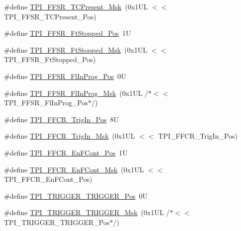 \begin{DoxyCompactItemize}
\item 
\#define \mbox{\hyperlink{group___c_m_s_i_s___t_p_i_ga0d6bfd263ff2fdec72d6ec9415fb1135}{T\+P\+I\+\_\+\+F\+F\+S\+R\+\_\+\+T\+C\+Present\+\_\+\+Msk}}~(0x1\+U\+L $<$$<$ T\+P\+I\+\_\+\+F\+F\+S\+R\+\_\+\+T\+C\+Present\+\_\+\+Pos)
\item 
\#define \mbox{\hyperlink{group___c_m_s_i_s___t_p_i_gaedf31fd453a878021b542b644e2869d2}{T\+P\+I\+\_\+\+F\+F\+S\+R\+\_\+\+Ft\+Stopped\+\_\+\+Pos}}~1U
\item 
\#define \mbox{\hyperlink{group___c_m_s_i_s___t_p_i_ga1ab6c3abe1cf6311ee07e7c479ce5f78}{T\+P\+I\+\_\+\+F\+F\+S\+R\+\_\+\+Ft\+Stopped\+\_\+\+Msk}}~(0x1\+U\+L $<$$<$ T\+P\+I\+\_\+\+F\+F\+S\+R\+\_\+\+Ft\+Stopped\+\_\+\+Pos)
\item 
\#define \mbox{\hyperlink{group___c_m_s_i_s___t_p_i_ga542ca74a081588273e6d5275ba5da6bf}{T\+P\+I\+\_\+\+F\+F\+S\+R\+\_\+\+Fl\+In\+Prog\+\_\+\+Pos}}~0U
\item 
\#define \mbox{\hyperlink{group___c_m_s_i_s___t_p_i_ga63dfb09259893958962914fc3a9e3824}{T\+P\+I\+\_\+\+F\+F\+S\+R\+\_\+\+Fl\+In\+Prog\+\_\+\+Msk}}~(0x1\+U\+L /$\ast$$<$$<$ T\+P\+I\+\_\+\+F\+F\+S\+R\+\_\+\+Fl\+In\+Prog\+\_\+\+Pos$\ast$/)
\item 
\#define \mbox{\hyperlink{group___c_m_s_i_s___t_p_i_gaa7ea11ba6ea75b541cd82e185c725b5b}{T\+P\+I\+\_\+\+F\+F\+C\+R\+\_\+\+Trig\+In\+\_\+\+Pos}}~8U
\item 
\#define \mbox{\hyperlink{group___c_m_s_i_s___t_p_i_ga360b413bc5da61f751546a7133c3e4dd}{T\+P\+I\+\_\+\+F\+F\+C\+R\+\_\+\+Trig\+In\+\_\+\+Msk}}~(0x1\+U\+L $<$$<$ T\+P\+I\+\_\+\+F\+F\+C\+R\+\_\+\+Trig\+In\+\_\+\+Pos)
\item 
\#define \mbox{\hyperlink{group___c_m_s_i_s___t_p_i_ga99e58a0960b275a773b245e2b69b9a64}{T\+P\+I\+\_\+\+F\+F\+C\+R\+\_\+\+En\+F\+Cont\+\_\+\+Pos}}~1U
\item 
\#define \mbox{\hyperlink{group___c_m_s_i_s___t_p_i_ga27d1ecf2e0ff496df03457a2a97cb2c9}{T\+P\+I\+\_\+\+F\+F\+C\+R\+\_\+\+En\+F\+Cont\+\_\+\+Msk}}~(0x1\+U\+L $<$$<$ T\+P\+I\+\_\+\+F\+F\+C\+R\+\_\+\+En\+F\+Cont\+\_\+\+Pos)
\item 
\#define \mbox{\hyperlink{group___c_m_s_i_s___t_p_i_ga5517fa2ced64efbbd413720329c50b99}{T\+P\+I\+\_\+\+T\+R\+I\+G\+G\+E\+R\+\_\+\+T\+R\+I\+G\+G\+E\+R\+\_\+\+Pos}}~0U
\item 
\#define \mbox{\hyperlink{group___c_m_s_i_s___t_p_i_ga814227af2b2665a0687bb49345e21110}{T\+P\+I\+\_\+\+T\+R\+I\+G\+G\+E\+R\+\_\+\+T\+R\+I\+G\+G\+E\+R\+\_\+\+Msk}}~(0x1\+U\+L /$\ast$$<$$<$ T\+P\+I\+\_\+\+T\+R\+I\+G\+G\+E\+R\+\_\+\+T\+R\+I\+G\+G\+E\+R\+\_\+\+Pos$\ast$/)

\end{DoxyCompactItemize}

